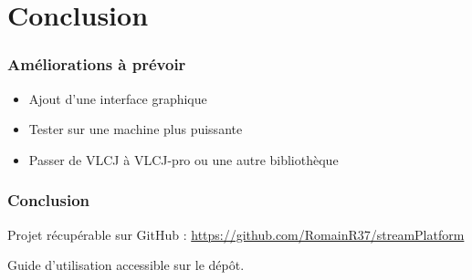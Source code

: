\documentclass{beamer}
\begin{document}
\section*{Conclusion}

\begin{frame}
\frametitle{Améliorations à prévoir}

\begin{itemize}
	\item Ajout d'une interface graphique
	\item Tester sur une machine plus puissante
	\item Passer de VLCJ à VLCJ-pro ou une autre bibliothèque
\end{itemize}

\end{frame}

\begin{frame}
\frametitle{Conclusion}

Projet récupérable sur GitHub : \url{https://github.com/RomainR37/streamPlatform}
\bigbreak

Guide d'utilisation accessible sur le dépôt.

\end{frame}
\end{document}
